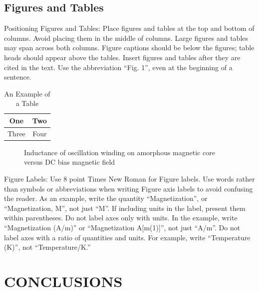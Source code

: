 \documentclass[letterpaper, 10 pt, conference]{ieeeconf}  %
\begin{document}
\subsection{Figures and Tables}

Positioning Figures and Tables: Place figures and tables at the top and bottom of columns. Avoid placing them in the middle of columns. Large figures and tables may span across both columns. Figure captions should be below the figures; table heads should appear above the tables. Insert figures and tables after they are cited in the text. Use the abbreviation ``Fig. 1'', even at the beginning of a sentence.

\begin{table}[h]
\caption{An Example of a Table}
\label{table_example}
\begin{center}
\begin{tabular}{|c||c|}
\hline
One & Two\\
\hline
Three & Four\\
\hline
\end{tabular}
\end{center}
\end{table}


   \begin{figure}[thpb]
      \centering
      \caption{Inductance of oscillation winding on amorphous
       magnetic core versus DC bias magnetic field}
      \label{figurelabel}
   \end{figure}
   

Figure Labels: Use 8 point Times New Roman for Figure labels. Use words rather than symbols or abbreviations when writing Figure axis labels to avoid confusing the reader. As an example, write the quantity ``Magnetization'', or ``Magnetization, M'', not just ``M''. If including units in the label, present them within parentheses. Do not label axes only with units. In the example, write ``Magnetization (A/m)'' or ``Magnetization {A[m(1)]}'', not just ``A/m''. Do not label axes with a ratio of quantities and units. For example, write ``Temperature (K)'', not ``Temperature/K.''

\section{CONCLUSIONS}
\end{document}
